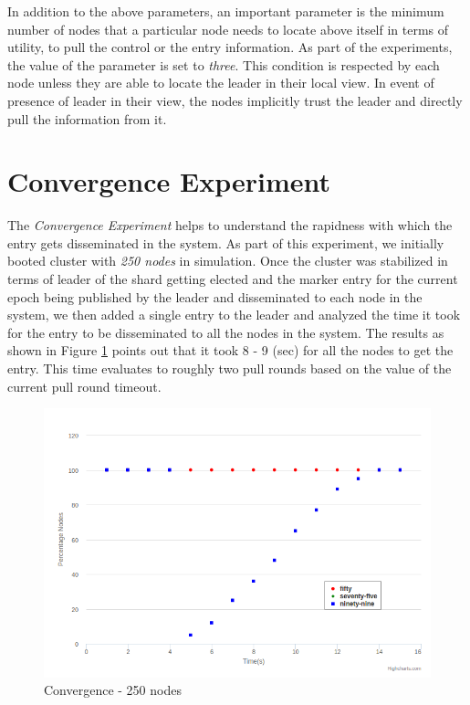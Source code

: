 \documentclass[a4paper,11pt]{kth-mag}
\begin{document}
In addition to the above parameters, an important parameter is the minimum number of nodes that a particular node needs to locate above itself in terms of utility, to pull the control or the entry information. As part of the experiments, the value of the parameter is set to \textit{three}. This condition is respected by each node unless they are able to locate the leader in their local view. In event of presence of leader in their view, the nodes implicitly trust the leader and  directly pull the information from it.


\section{Convergence Experiment}

The \textit{Convergence Experiment} helps to understand the rapidness with which the entry gets disseminated in the system. As part of this experiment, we initially booted cluster with \textit{250 nodes} in simulation. Once the cluster was stabilized in terms of leader of the shard getting elected and the marker entry for the current epoch being published by the leader and disseminated to each node in the system, we then added a single entry to the leader and analyzed the time it took for the entry to be disseminated to all the nodes in the system. The results as shown in Figure \ref{fig:250conv} points out that it took 8 - 9 (sec) for all the nodes to get the entry. This time evaluates to roughly two pull rounds based on the value of the current pull round timeout.

\begin{figure}[h]
	\includegraphics[scale=0.5]{250Convergence}
	\caption{Convergence - 250 nodes}
	\label{fig:250conv}
\end{figure}
\end{document}
